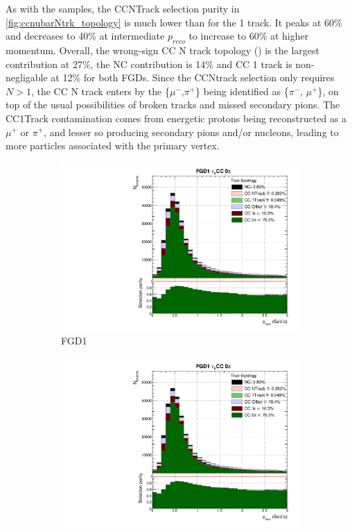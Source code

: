 As with the \numu samples, the CCNTrack selection purity in \autoref{fig:ccnubarNtrk_topology} is much lower than for the 1 track. It peaks at 60\% and decreases to 40\% at intermediate $p_{reco}$ to increase to 60\% at higher momentum. Overall, the wrong-sign CC N track topology (\numu) is the largest contribution at 27\%, the NC contribution is 14\% and \numubar CC 1 track is non-negligable at 12\% for both FGDs. Since the CCNtrack selection only requires $N>1$, the \numu CC N track enters by the \{$\mu^-$,$\pi^+$\} being identified as \{$\pi^-$, $\mu^+$\}, on top of the usual possibilities of broken tracks and missed secondary pions. The CC1Track contamination comes from energetic protons being reconstructed as a $\mu^+$ or $\pi^+$, and lesser so producing secondary pions and/or nucleons, leading to more particles associated with the primary vertex.
\begin{figure}[h]
	\begin{subfigure}[t]{0.49\textwidth}
		\includegraphics[width=\textwidth,page=15, trim={0mm 0mm 0mm 9mm}, clip]{figures/mach3/selection/2017b_Diag_WithSelection}
		\caption{FGD1}
	\end{subfigure}
	\begin{subfigure}[t]{0.49\textwidth}
		\includegraphics[width=\textwidth,page=19, trim={0mm 0mm 0mm 9mm}, clip]{figures/mach3/selection/2017b_Diag_WithSelection}

\end{subfigure}
\end{figure}
